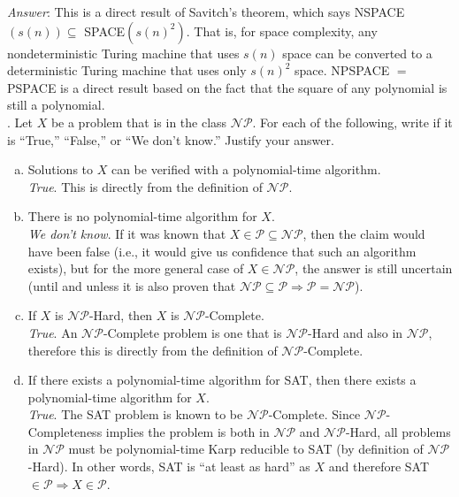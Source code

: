 \documentclass{scrartcl}
\begin{document}
    \noindent
    \textit{Answer}: This is a direct result of Savitch's theorem, which says \textsf{NSPACE$(s(n))
    \subseteq$ SPACE$(s(n)^2)$}. That is, for space complexity, any nondeterministic Turing machine
    that uses $s(n)$ space can be converted to a deterministic Turing machine that uses only
    $s(n)^2$ space. \textsf{NPSPACE $=$ PSPACE} is a direct result based on the fact that the square
    of any polynomial is still a polynomial.\\

    \newpage
    . Let $X$ be a problem that is in the class $\mathcal{NP}$. For each of the following, write if
    it is ``True,'' ``False,'' or ``We don't know.'' Justify your answer.
    \begin{enumerate}[(a)]
        \item Solutions to $X$ can be verified with a polynomial-time algorithm.\\

            \textit{True}. This is directly from the definition of $\mathcal{NP}$.\\
        \item There is no polynomial-time algorithm for $X$.\\

            \textit{We don't know}. If it was known that $X \in \mathcal{P} \subseteq \mathcal{NP}$,
            then the claim would have been false (i.e., it would give us confidence that such an
            algorithm exists), but for the more general case of $X \in \mathcal{NP}$, the answer is
            still uncertain (until and unless it is also proven that $\mathcal{NP} \subseteq
            \mathcal{P} \Rightarrow \mathcal{P} = \mathcal{NP}$).\\
        \item If $X$ is $\mathcal{NP}$-Hard, then $X$ is $\mathcal{NP}$-Complete.\\

            \textit{True}. An $\mathcal{NP}$-Complete problem is one that is $\mathcal{NP}$-Hard and
            also in $\mathcal{NP}$, therefore this is directly from the definition of
            $\mathcal{NP}$-Complete.\\
        \item If there exists a polynomial-time algorithm for \textsf{SAT}, then there exists a
            polynomial-time algorithm for $X$.\\

            \textit{True}. The \textsf{SAT} problem is known to be $\mathcal{NP}$-Complete. Since
            $\mathcal{NP}$-Completeness implies the problem is both in $\mathcal{NP}$ and
            $\mathcal{NP}$-Hard, all problems in $\mathcal{NP}$ must be polynomial-time Karp
            reducible to \textsf{SAT} (by definition of $\mathcal{NP}$-Hard). In other words,
            \textsf{SAT} is ``at least as hard'' as $X$ and therefore \textsf{SAT} $\in \mathcal{P}
            \Rightarrow X \in \mathcal{P}$.
    \end{enumerate}
\end{document}

